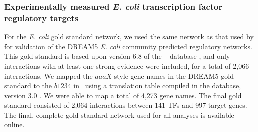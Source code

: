 \subsubsection{Experimentally measured {\it E. coli} transcription factor regulatory targets}
\label{section:eco:gold:standard}

For the {\it E. coli} gold standard network, we used the same network
as that used by \cite{Marbach2012} for validation of the DREAM5 {\it
E. coli} community predicted regulatory networks. This gold standard
is based upon version 6.8 of the \rdb~
database \cite{Gama-Castro2011}, and only interactions with at least
one strong evidence were included, for a total of 2,066 interactions.
We mapped the $aaaX$-style gene names in the DREAM5 gold standard to
the $b1234$ in \cm~using a translation table compiled in the
{} database, version 3.0 \cite{Zhou2013a}. We were
able to map a total of 4,273 gene names. The final gold standard
consisted of 2,064 interactions between 141 TFs and 997 target
genes. The final, complete gold standard network used for all analyses
is available \href{http://egrin2.systemsbiology.net/}{online}.
